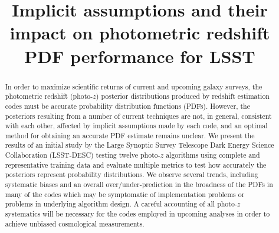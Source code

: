 \documentclass[\docopts]{\docclass}
\begin{document}
\linenumbers

\title{Implicit assumptions and their impact on photometric redshift PDF performance for LSST}

\maketitlepre

\begin{abstract}

In order to maximize scientific returns of current and upcoming galaxy surveys, the photometric redshift (photo-$z$) posterior distributions produced by redshift estimation codes must be accurate probability distribution functions (PDFs).  However, the posteriors resulting from a number of current techniques are not, in general, consistent with each other, affected by implicit assumptions made by each code, and an optimal method for obtaining an accurate PDF estimate remains unclear.   We present the results of an initial study by the Large Synoptic Survey Telescope Dark Energy Science Collaboration (\textsc{LSST-DESC}) testing twelve photo-$z$ algorithms using complete and representative training data and evaluate multiple metrics to test how accurately the posteriors represent probability distributions.  We observe several trends, including systematic biases and an overall over/under-prediction in the broadness of the PDFs in many of the codes which may be symptomatic of implementation problems or problems in underlying algorithm design.  A careful accounting of all photo-$z$ systematics will be necessary for the codes employed in upcoming analyses in order to achieve unbiased cosmological measurements.
  

\end{abstract}
\end{document}
